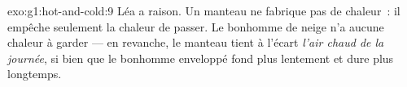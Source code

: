 \begin{solution}{exo:g1:hot-and-cold:9}
Léa a raison. Un manteau ne fabrique pas de chaleur~: il empêche
seulement la chaleur de passer. Le bonhomme de neige n'a aucune
chaleur à garder --- en revanche, le manteau tient à l'écart
\emph{l'air chaud de la journée}, si bien que le bonhomme enveloppé
fond plus lentement et dure plus longtemps.
\end{solution}
